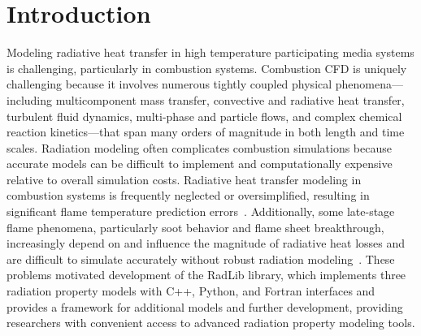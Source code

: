 \documentclass[preprint,12pt]{elsarticle}
\begin{document}
    \section{Introduction} \label{s:intro}

    Modeling radiative heat transfer in high temperature participating media systems is challenging, particularly in
    combustion systems.
    Combustion CFD is uniquely challenging because
    it involves numerous tightly coupled physical phenomena---including multicomponent mass transfer, convective and
    radiative heat transfer, turbulent fluid dynamics, multi-phase and particle flows, and complex chemical reaction
    kinetics---that span many orders of magnitude in both length and time scales.
    Radiation modeling often complicates combustion simulations because accurate models can be difficult to
    implement and
    computationally expensive relative to overall simulation costs.
    Radiative heat transfer modeling in combustion systems
    is frequently neglected or oversimplified, resulting in significant flame temperature prediction errors~\citep{Modest_2016}.
    Additionally, some late-stage flame phenomena, particularly soot behavior and flame sheet breakthrough,
    increasingly depend on and influence the magnitude of radiative heat losses and are difficult to simulate
    accurately without robust radiation modeling~\cite{Modest_2013}. These problems motivated development of the
    RadLib library, which implements three radiation property models with C++, Python, and Fortran interfaces and
    provides a framework for additional models and further development, providing researchers with convenient access to
    advanced radiation property modeling tools.
\end{document}
